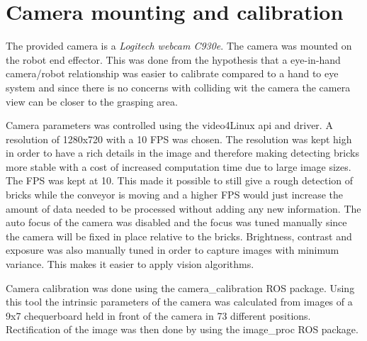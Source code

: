 \section{Camera mounting and calibration}
\label{sec:rc_camera}
The provided camera is a \textit{Logitech webcam C930e}. The camera was mounted on the robot end effector. This was done from the hypothesis that a eye-in-hand camera/robot relationship was easier to calibrate compared to a hand to eye system and since there is no concerns with colliding wit the camera the camera view can be closer to the grasping area.

Camera parameters was controlled using the video4Linux api and driver. A resolution of 1280x720 with a 10 FPS was chosen. The resolution was kept high in order to have a rich details in the image and therefore making detecting bricks more stable with a cost of increased computation time due to large image sizes. The FPS was kept at 10. This made it possible to still give a rough detection of bricks while the conveyor is moving and a higher FPS would just increase the amount of data needed to be processed without adding any new information.
The auto focus of the camera was disabled and the focus was tuned manually since the camera will be fixed in place relative to the bricks.
Brightness, contrast and exposure was also manually tuned in order to capture images with minimum variance. This makes it easier to apply vision algorithms.

Camera calibration was done using the camera\_calibration ROS package. Using this tool the intrinsic parameters of the camera was calculated from images of a 9x7 chequerboard held in front of the camera in 73 different positions. Rectification of the image was then done by using the image\_proc ROS package.
